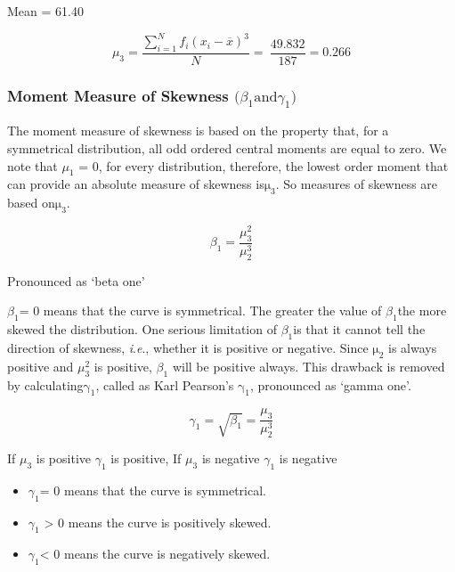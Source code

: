 \documentclass[
]{book}
\begin{document}
Mean = 61.40

\[\mu_{3} = \frac{\sum_{i = 1}^{N}{f_{i}\left( x_{i} - \overline{x} \right)^{3}}}{N} = \ \frac{49.832}{187} = 0.266\]

\hypertarget{moment-measure-of-skewness-mathbfbeta_1textandgamma_1mathbf}{%
\subsubsection{\texorpdfstring{Moment Measure of Skewness \(\mathbf{(}\beta_{1}\text{and}\)\(\gamma_{1}\mathbf{)}\)}{Moment Measure of Skewness \textbackslash mathbf\{(\}\textbackslash beta\_\{1\}\textbackslash text\{and\}\textbackslash gamma\_\{1\}\textbackslash mathbf\{)\}}}\label{moment-measure-of-skewness-mathbfbeta_1textandgamma_1mathbf}}

The moment measure of skewness is based on the property that, for a
symmetrical distribution, all odd ordered central moments are equal to
zero. We note that \(\mu_{1}\) = 0, for every distribution, therefore, the
lowest order moment that can provide an absolute measure of skewness
is\(\text{μ}_{3}\). So measures of skewness are based
on\(\text{μ}_{3}\).

\[\beta_{1} = \frac{\mu_{3}^{2}}{\mu_{2}^{3}}\]

Pronounced as `beta one'

\(\beta_{1}\)= 0 means that the curve is symmetrical. The greater the
value of \(\beta_{1}\)the more skewed the distribution. One serious
limitation of \(\beta_{1}\)is that it cannot tell the direction of
skewness, \emph{i}.\emph{e}., whether it is positive or negative. Since
\(\text{μ}_{2}\) is always positive and \(\mu_{3}^{2}\) is positive,
\(\beta_{1}\) will be positive always. This drawback is removed by
calculating\(\text{γ}_{1}\), called as Karl Pearson's\(\text{ γ}_{1}\),
pronounced as `gamma one'.

\[\gamma_{1} = \sqrt{\beta_{1}} = \frac{\mu_{3}}{\mu_{2}^{3}}\]

If \(\mu_{3}\) is positive \(\gamma_{1}\) is positive, If \(\mu_{3}\) is
negative \(\gamma_{1}\) is negative

\begin{itemize}
\item
  \(\gamma_{1}\)= 0 means that the curve is symmetrical.
\item
  \(\gamma_{1}\) \textgreater{} 0 means the curve is positively skewed.
\item
  \(\gamma_{1}\)\textless{} 0 means the curve is negatively skewed.
\end{itemize}
\end{document}
